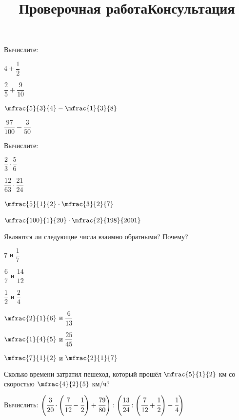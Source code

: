 %
\begin{exam}
	\title{Проверочная работа}
	\begin{listofex}
		\item Вычислите:
		\begin{enumcols}[itemcolumns=4]
			\item \( 4+\dfrac{1}{2} \)
			\item \( \dfrac{2}{5}+\dfrac{9}{10} \)
			\item \( \mfrac{5}{3}{4}-\mfrac{1}{3}{8} \)
			\item \( \dfrac{97}{100}-\dfrac{3}{50} \)
		\end{enumcols}
		\item Вычислите:
		\begin{enumcols}[itemcolumns=4]
			\item \( \dfrac{2}{3}\cdot\dfrac{5}{6} \)
			\item \( \dfrac{12}{63}\cdot\dfrac{21}{24} \)
			\item \( \mfrac{5}{1}{2}\cdot\mfrac{3}{2}{7} \)
			\item \( \mfrac{100}{1}{20}\cdot\mfrac{2}{198}{2001} \)
		\end{enumcols}
			\item Являются ли следующие числа взаимно обратными? Почему?
			\begin{enumcols}[itemcolumns=6]
				\item \( 7 \) и \( \dfrac{1}{7} \)
				\item \( \dfrac{6}{7} \) и \( \dfrac{14}{12} \)
				\item \( \dfrac{1}{2} \) и \( \dfrac{2}{4} \)
				\item \( \mfrac{2}{1}{6} \) и \( \dfrac{6}{13} \)
				\item \( \mfrac{1}{4}{5} \) и \( \dfrac{25}{45} \)
				\item \( \mfrac{7}{1}{2} \) и \( \mfrac{2}{1}{7} \)
			\end{enumcols}			
			\item Сколько времени затратил пешеход, который прошёл \( \mfrac{5}{1}{2} \) км со скоростью \( \mfrac{4}{2}{5} \) км/ч?
			\item Вычислить: \( \left( \cfrac{3}{20}\cdot\left( \cfrac{7}{12}-\cfrac{1}{2} \right)+\cfrac{79}{80} \right):\left( \cfrac{13}{24}:\left( \cfrac{7}{12}+\cfrac{1}{2} \right)-\cfrac{1}{4} \right) \)
	\end{listofex}
\end{exam}
		\newpage
		\title{Консультация}
